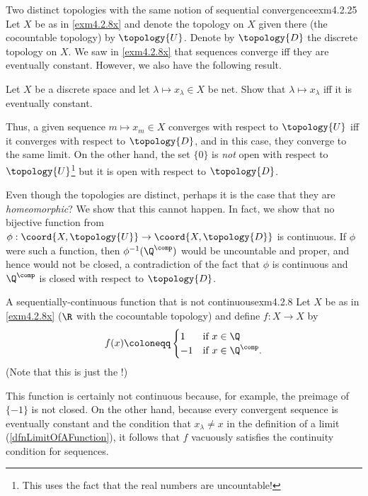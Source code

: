 \begin{exm}{Two distinct topologies with the same notion of sequential convergence}{exm4.2.25}
Let $X$ be as in \cref{exm4.2.8x} and denote the topology on $X$ given there (the cocountable topology) by $\topology{U}$.  Denote by $\topology{D}$ the discrete topology on $X$.  We saw in \cref{exm4.2.8x} that sequences converge iff they are eventually constant.  However, we also have the following result.
\begin{exr}[breakable=false]{}{}
Let $X$ be a discrete space and let $\lambda \mapsto x_\lambda \in X$ be net.  Show that $\lambda \mapsto x_\lambda$ iff it is eventually constant.
\end{exr}
Thus, a given sequence $m\mapsto x_m\in X$ converges with respect to $\topology{U}$ iff it converges with respect to $\topology{D}$, and in this case, they converge to the same limit.  On the other hand, the set $\{ 0\}$ is \emph{not} open with respect to $\topology{U}$\footnote{This uses the fact that the real numbers are uncountable!} but it is open with respect to $\topology{D}$.

Even though the topologies are distinct, perhaps it is the case that they are \emph{homeomorphic}?  We show that this cannot happen.  In fact, we show that no bijective function from $\phi :\coord{X,\topology{U}}\rightarrow \coord{X,\topology{D}}$ is continuous.  If $\phi$ were such a function, then $\phi ^{-1}(\Q ^{\comp})$ would be uncountable and proper, and hence would not be closed, a contradiction of the fact that $\phi$ is continuous and $\Q ^{\comp}$ is closed with respect to $\topology{D}$.
\end{exm}
\begin{exm}{A sequentially-continuous function that is not continuous}{exm4.2.8}
Let $X$ be as in \cref{exm4.2.8x} ($\R$ with the cocountable topology) and define $f\colon X\rightarrow X$ by
\begin{equation}
f(x)\coloneqq \begin{cases}1 & \text{if }x\in \Q \\ -1 & \text{if }x\in \Q ^{\comp}.\end{cases}
\end{equation}
(Note that this is just the !)

This function is certainly not continuous because, for example, the preimage of $\{ -1\}$ is not closed.  On the other hand, because every convergent sequence is eventually constant and the condition that $x_\lambda \neq x$ in the definition of a limit (\cref{dfnLimitOfAFunction}), it follows that $f$ vacuously satisfies the continuity condition for sequences.
\end{exm}
